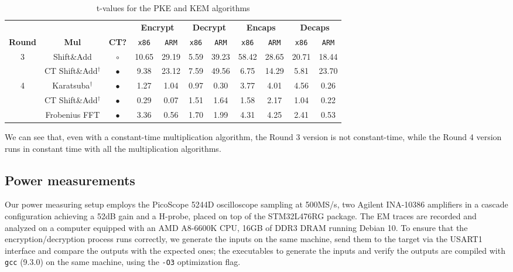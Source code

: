 \documentclass[11pt,a4paper,twocolumn]{article}
\theoremstyle{definition}
\begin{document}
\begin{table}[ht]\small
    \centering
    \caption{t-values for the PKE and KEM algorithms}
    \begin{tabular}{c | c c | c c | c c | c c | c c }
        \toprule
        &  & &  \multicolumn{2}{c|}{\textbf{Encrypt}} & \multicolumn{2}{c|}{\textbf{Decrypt}} &  \multicolumn{2}{c|}{\textbf{Encaps}} & \multicolumn{2}{c}{\textbf{Decaps}}\\
        \textbf{Round} & \textbf{Mul} & \textbf{CT?} & \texttt{x86} & \texttt{ARM} & \texttt{x86} & \texttt{ARM} & \texttt{x86} & \texttt{ARM} & \texttt{x86} & \texttt{ARM} \\
        \midrule
        \multirow{2}{*}{3}
        & Shift\&Add & $\circ$ & 10.65 & 29.19 & 5.59 & 39.23 & 58.42 & 28.65 & 20.71 & 18.44\\
        & CT Shift\&Add$^\dagger$ & $\bullet$ & 9.38 & 23.12 & 7.59 & 49.56 & 6.75 & 14.29 & 5.81 & 23.70 \\
        \midrule
        \multirow{3}{*}{4}
        & Karatsuba$^\dagger$ & $\bullet$ & 1.27 & 1.04 & 0.97 & 0.30 & 3.77 & 4.01 & 4.56 & 0.26\\
        & CT Shift\&Add$^\dagger$ & $\bullet$ & 0.29 & 0.07 & 1.51 & 1.64 & 1.58 & 2.17 & 1.04 & 0.22 \\
        & Frobenius FFT & $\bullet$ & 3.36 & 0.56 & 1.70 & 1.99 & 4.31 & 4.25 & 2.41 & 0.53 \\
        \bottomrule
    \end{tabular}
    \label{tab:ct}
\end{table}

We can see that, even with a constant-time multiplication algorithm, the Round 3 version is not constant-time, while the Round 4 version
runs in constant time with all the multiplication algorithms. 

\subsection{Power measurements}
Our power measuring setup employs the PicoScope 5244D oscilloscope sampling at 500MS/s, two Agilent INA-10386 amplifiers in a cascade
configuration achieving a 52dB gain and a H-probe, placed on top of the STM32L476RG package. The EM traces are recorded and analyzed on a 
computer equipped with an AMD A8-6600K CPU, 16GB of DDR3 DRAM running Debian 10. To ensure that the encryption/decryption process runs
correctly, we generate the inputs on the same machine, send them to the target via the USART1 interface and compare the outputs with the
expected ones; the executables to generate the inputs and verify the outputs are compiled with \texttt{gcc} (9.3.0) on the same machine,
using the \texttt{-O3} optimization flag.
\end{document}
